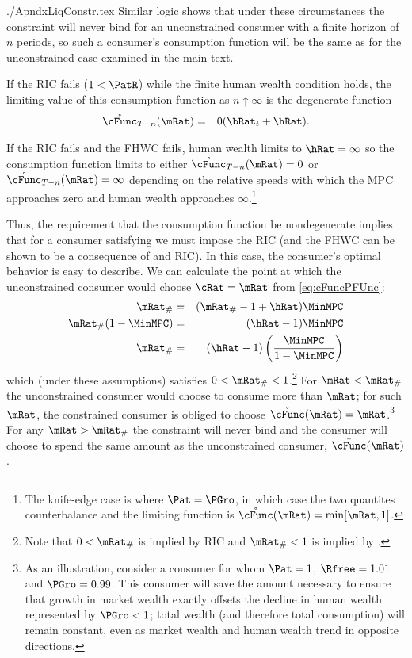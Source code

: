 \documentclass{econtex}
\begin{document}
\begin{verbatimwrite}{./ApndxLiqConstr.tex}
Similar logic shows that under these circumstances the constraint will
never bind for an unconstrained consumer with a finite horizon of $n$
periods, so such a consumer's consumption function will be the same as for the
unconstrained case examined in the main text.

If the RIC fails ($1 < \PatR$) while the finite human wealth condition
holds, the limiting value of this consumption function as $n \uparrow
\infty$ is the degenerate function
\begin{eqnarray}
  \mathring{\cFunc}_{T-n}(\mRat) & = & 0 (\bRat_{t}+\hRat).
\end{eqnarray}

If the RIC fails and the FHWC fails, human wealth limits to $\hRat =
\infty$ so the consumption function limits to either
$\mathring{\cFunc}_{T-n}(\mRat) = 0$ or
$\mathring{\cFunc}_{T-n}(\mRat) = \infty$ depending on the relative
speeds with which the MPC approaches zero and human wealth approaches
$\infty$.\footnote{The knife-edge case is where $\Pat = \PGro$, in
  which case the two quantites counterbalance and the limiting
  function is $\mathring{\cFunc}(\mRat)=\min[\mRat,1]$.}

Thus, the requirement that the consumption function be nondegenerate
implies that for a consumer satisfying  we must impose
the RIC (and the FHWC can be shown to be a consequence of  and RIC).  In
this case, the consumer's optimal behavior is easy to describe.  We
can calculate the point at which the unconstrained consumer would
choose $\cRat = \mRat$ from \eqref{eq:cFuncPFUnc}:
\begin{eqnarray}
  \mRat_{\#} & = & (\mRat_{\#}-1+\hRat)\MinMPC
\\ \mRat_{\#}(1-\MinMPC) & = & (\hRat - 1)\MinMPC
\\ \mRat_{\#} & = & (\hRat - 1)\left(\frac{\MinMPC}{1-\MinMPC}\right)
\end{eqnarray}
which (under these assumptions) satisfies $0 < \mRat_{\#} < 1$.\footnote{Note that $0 < \mRat_{\#}$ is implied by RIC and $ \mRat_{\#}<1$ is implied by \mbox{}.}  For
$\mRat < \mRat_{\#}$ the unconstrained consumer would choose to
consume more than $\mRat$; for such $\mRat$, the constrained consumer
is obliged to choose $\mathring{\cFunc}(\mRat) = \mRat$.\footnote{As an
  illustration, consider a consumer for whom $\Pat = 1$, $\Rfree
  =1.01$ and $\PGro = 0.99$.  This consumer will save the amount
  necessary to ensure that growth in market wealth exactly offsets the
  decline in human wealth represented by $\PGro < 1$; total wealth
  (and therefore total consumption) will remain constant, even as
  market wealth and human wealth trend in opposite directions.}  For
any $\mRat > \mRat_{\#}$ the constraint will never bind and the
consumer will choose to spend the same amount as the unconstrained
consumer, $\bar{\cFunc}(\mRat)$.



\end{verbatimwrite}
\end{document}
